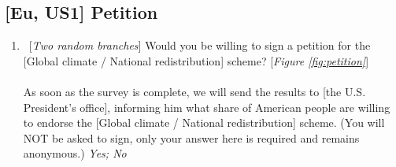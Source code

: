 \subsection*{[Eu, US1] Petition}
\begin{enumerate}[resume] \item ~[\textit{Two random branches}] \label{q:petition} Would you be willing to sign a petition for the [Global climate / National redistribution] scheme?  [\textit{Figure \ref{fig:petition}}]\\
\\
As soon as the survey is complete, we will send the results to [the U.S. President's office], informing him what share of American people are willing to endorse the [Global climate / National redistribution] scheme. (You will NOT be asked to sign, only your answer here is required and remains anonymous.) 
\textit{Yes; No}
\end{enumerate}

